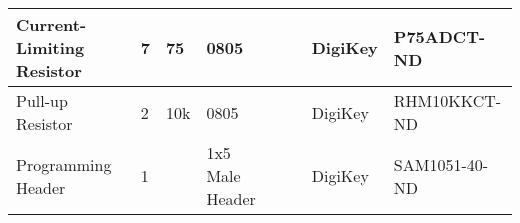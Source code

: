 \documentclass[12pt,letterpaper,onecolumn,landscape]{article}
\begin{document}
\begin{tabular}{ | l | l | l | l | l | l | l | l |}
	Current-Limiting Resistor & 
	7 & 
	75\ohm & 
	0805 & 
	 & 
	 & 
	DigiKey & 
	P75ADCT-ND
	\\ \hline

	Pull-up Resistor & 
	2 & 
	10k\ohm & 
	0805 & 
	 & 
	 & 
	DigiKey & 
	RHM10KKCT-ND
	\\ \hline

	Programming Header & 
	1 & 
	 & 
	1x5 Male Header & 
	 & 
	 & 
	DigiKey & 
	SAM1051-40-ND
	\\ \hline
	\end{tabular}
\end{document}
